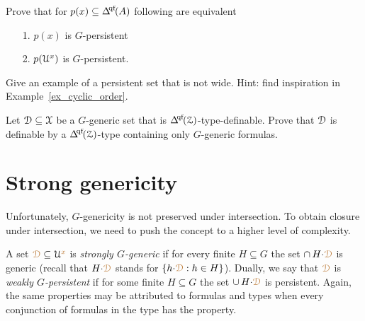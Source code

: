 \begin{exercise}\label{ex_persistent_types}
  Prove that for $p(x)\subseteq \qfDelta(A)$ following are equivalent
  \begin{itemize}
    \item[1.] $p(x)$ is $G$-persistent
    \item[2.] $p(\EuScript U^x)$ is $G$-persistent.
  \end{itemize}
\end{exercise}

\begin{exercise}
  Give an example of a persistent set that is not wide.
  Hint: find inspiration in Example~\ref{ex_cyclic_order}.
\end{exercise}

\begin{exercise}\label{ex_generic_type_vs_formulas}
  Let $\EuScript D\subseteq\EuScript X$ be a $G$-generic set that is $\qfDelta(\Z)$-type-definable.
  Prove that $\EuScript D$ is definable by a $\qfDelta(\Z)$-type containing only $G$-generic formulas.
\end{exercise}

\section{Strong genericity}\label{strong_genericity}

Unfortunately, $G$-genericity is not preserved under intersection.
To obtain closure under intersection, we need to push the concept to a higher level of complexity.

A set ${\color{brown}\EuScript D}\subseteq\EuScript U^{\color{brown} x}$ is \emph{strongly $G$-generic\/} if for every finite $H\subseteq G$ the set $\cap\,H{\cdot}{\color{brown}\EuScript D}$ is generic (recall that $H{\cdot}{\color{brown}\EuScript D}$ stands for $\{h{\cdot}{\color{brown}\EuScript D}: h\in H\}$).
Dually, we say that ${\color{brown}\EuScript D}$ is \emph{weakly $G$-persistent\/} if for some finite $H\subseteq G$ the set $\cup\,H{\cdot}{\color{brown}\EuScript D}$ is persistent.
Again, the same properties may be attributed to formulas and types when every conjunction of formulas in the type has the property.

